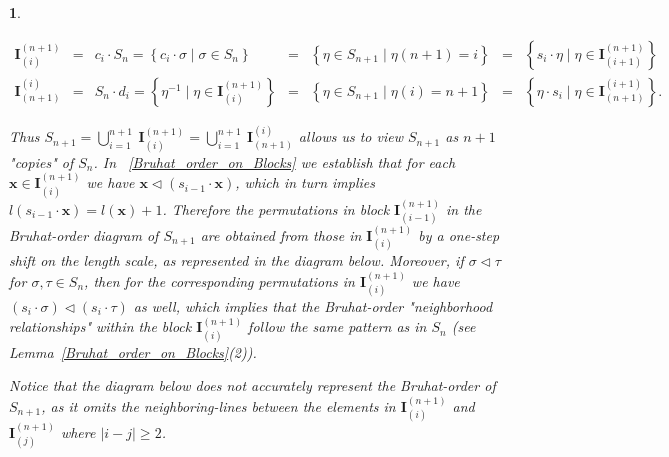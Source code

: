 \documentclass[a4 paper,12pt]{article}
\newcommand{\sma}{\triangleleft}
\newtheorem{numeris}{}[section]
\begin{document}
\begin{numeris}
\begin{center}
$
\begin{array}{cclclcl}
\textbf{I}_{(i)}^{(n+1)} &=&c_i\cdot  S_n = \left\{ c_{i}\cdot  \sigma  \mid \sigma \in S_{n} \right\} &=&  \left\{\eta\in S_{n+1} \mid \eta(n+1)=i\right\}  
&=& \left\{s_{i}\cdot  \eta  \mid \eta \in \textbf{I}_{(i+1)}^{(n+1)}\right\} \\[3mm]
\textbf{I}^{(i)}_{(n+1)} & = &  S_n  \cdot  d_i = \left\{\eta^{-1} \mid \eta \in \textbf{I}_{(i)}^{(n+1)}\right\}
&=& \left\{\eta\in S_{n+1} \mid \eta(i)=n+1\right\} 
&=& \left\{\eta \cdot  s_{i} \mid \eta \in \textbf{I}^{(i+1)}_{(n+1)}\right\}.
\end{array}$   
\end{center}
Thus 
	$S_{n+1} = \displaystyle \bigcup_{i=1}^{n+1}  \ \textbf{I}^{(n+1)}_{(i)} =  \displaystyle \bigcup_{i=1}^{n+1} \  \textbf{I}^{(i)}_{(n+1)}$
	allows us to view  $S_{n+1}$  as $n+1$ "\textit{copies}" of $S_n$. In  ~\ref{Bruhat_order_on_Blocks}  we establish  that  for each $\textbf{x}\in \textbf{I}_{(i)}^{(n+1)} $ we have $\textbf{x}\sma \left(s_{i-1}\cdot \textbf{x}\right)$, which in turn implies $l(s_{i-1}\cdot \textbf{x})= l(\textbf{x})+1$. Therefore the permutations in \textit{block} $\textbf{I}_{(i-1)}^{(n+1)}$ in the Bruhat-order diagram of $S_{n+1}$ are obtained from those in $\textbf{I}_{(i)}^{(n+1)}$ by a one-step shift on the length scale, as represented in the diagram below. Moreover, if $\sigma\sma \tau $  for $\sigma, \tau\in S_n$, then for the corresponding permutations in $\textbf{I}_{(i)}^{(n+1)} $ we have  $\left(s_{i}\cdot \sigma\right)\sma \left(s_{i}\cdot \tau\right) $ as well, which implies that the Bruhat-order "neighborhood relationships" within the block $\textbf{I}_{(i)}^{(n+1)}$ follow the same pattern as in $S_n$ (see  Lemma~\ref{Bruhat_order_on_Blocks}(2)).
	

  Notice that the  diagram below does not accurately represent the Bruhat-order of $S_{n+1}$, as it omits the \textit{neighboring-lines} between the elements in  $\textbf{I}_{(i)}^{(n+1)}$ and $\textbf{I}_{(j)}^{(n+1)}$ where $\left|i-j\right|\geq 2$.

\textrm{  }\\




\end{numeris}
\end{document}
